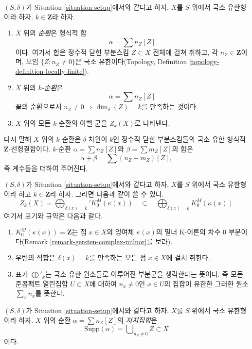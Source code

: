 \begin{definition}
\label{definition-cycles}
$(S, \delta)$가 Situation \ref{situation-setup}에서와 같다고 하자.
$X$를 $S$ 위에서 국소 유한형이라 하자. $k \in \mathbf{Z}$라 하자.
\begin{enumerate}
\item $X$ 위의 {\it 순환}은 형식적 합
$$
\alpha = \sum n_Z [Z]
$$
이다. 여기서 합은 정수적 닫힌 부분스킴 $Z \subset X$ 전체에 걸쳐
취하고, 각 $n_Z \in \mathbf{Z}$이며, 모임
$\{Z; n_Z \not = 0\}$은 국소 유한이다(Topology, Definition
\ref{topology-definition-locally-finite}).
\item $X$ 위의 {\it $k$-순환}은
$$
\alpha = \sum n_Z [Z]
$$
꼴의 순환으로서 $n_Z \not = 0 \Rightarrow \dim_\delta(Z) = k$를
만족하는 것이다.
\item $X$ 위의 모든 $k$-순환의 아벨 군을 $Z_k(X)$로 나타낸다.
\end{enumerate}
\end{definition}

\noindent
다시 말해 $X$ 위의 $k$-순환은 $\delta$-차원이 $k$인 정수적 닫힌
부분스킴들의 국소 유한 형식적 $\mathbf{Z}$-선형결합이다.
$k$-순환 $\alpha = \sum n_Z[Z]$와 $\beta = \sum m_Z[Z]$의 합은
$$
\alpha + \beta = \sum (n_Z + m_Z)[Z],
$$
즉 계수들을 더하여 주어진다.

\begin{remark}
\label{remark-cycles-pointwise}
$(S, \delta)$가 Situation \ref{situation-setup}에서와 같다고 하자.
$X$를 $S$ 위에서 국소 유한형이라 하고 $k \in \mathbf{Z}$라 하자.
그러면 다음과 같이 쓸 수 있다.
$$
Z_k(X) = \bigoplus\nolimits_{\delta(x) = k}' K_0^M(\kappa(x))
\quad\subset\quad
\bigoplus\nolimits_{\delta(x) = k} K_0^M(\kappa(x))
$$
여기서 표기와 규약은 다음과 같다.
\begin{enumerate}
\item $K_0^M(\kappa(x)) = \mathbf{Z}$는 점 $x \in X$의 잉여체
$\kappa(x)$의 밀너 K-이론의 차수 $0$ 부분이다(Remark
\ref{remark-gersten-complex-milnor}를 보라).
\item 우변의 직합은 $\delta(x) = k$를 만족하는 모든 점
$x \in X$에 걸쳐 취한다.
\item 표기 $\bigoplus'_x$는 국소 유한 원소들로 이루어진 부분군을
생각한다는 뜻이다. 즉 모든 준콤팩트 열린집합 $U \subset X$에 대하여
$n_x \not = 0$인 $x \in U$의 집합이 유한한 그러한 원소
$\sum_x n_x$를 뜻한다.
\end{enumerate}
\end{remark}

\begin{definition}
\label{definition-support-cycle}
$(S, \delta)$가 Situation \ref{situation-setup}에서와 같다고 하자.
$X$를 $S$ 위에서 국소 유한형이라 하자. $X$ 위의 순환
$\alpha = \sum n_Z [Z]$의 {\it 지지집합}은
$$
\text{Supp}(\alpha) = \bigcup\nolimits_{n_Z \not = 0} Z \subset X
$$
이다.
\end{definition}

